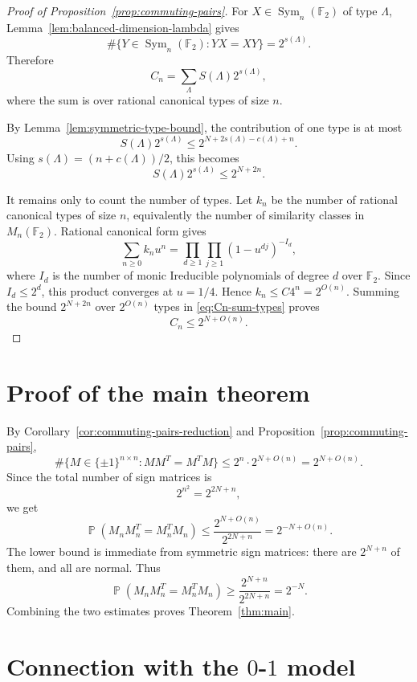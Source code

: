 \documentclass[11pt]{amsart}
\theoremstyle{remark}
\numberwithin{equation}{section}
\newcommand{\F}{\mathbb F}
\newcommand{\Sym}{\operatorname{Sym}}
\DeclareMathOperator{\probb}{\mathbb P}
\begin{document}
\begin{proof}[Proof of Proposition~\ref{prop:commuting-pairs}]
For $X\in\Sym_n(\F_2)$ of type $\Lambda$, Lemma~\ref{lem:balanced-dimension-lambda} gives
\[
        \#\{Y\in\Sym_n(\F_2):YX=XY\}=2^{s(\Lambda)}.
\]
Therefore
\begin{equation}\label{eq:Cn-sum-types}
        C_n=\sum_\Lambda S(\Lambda)2^{s(\Lambda)},
\end{equation}
where the sum is over rational canonical types of size $n$.

By Lemma~\ref{lem:symmetric-type-bound}, the contribution of one type is at most
\[
        S(\Lambda)2^{s(\Lambda)}
        \leq 2^{N+2s(\Lambda)-c(\Lambda)+n}.
\]
Using $s(\Lambda)=(n+c(\Lambda))/2$, this becomes
\[
        S(\Lambda)2^{s(\Lambda)}\leq 2^{N+2n}.
\]

It remains only to count the number of types.  Let $k_n$ be the number of rational canonical types of size $n$, equivalently the number of similarity classes in $M_n(\F_2)$.  Rational canonical form gives
\[
        \sum_{n\geq0}k_nu^n
        =\prod_{d\geq1}\prod_{j\geq1}(1-u^{dj})^{-I_d},
\]
where $I_d$ is the number of monic Ireducible polynomials of degree $d$ over $\F_2$.  Since $I_d\leq2^d$, this product converges at $u=1/4$.  Hence $k_n\leq C4^n=2^{O(n)}$.  Summing the bound $2^{N+2n}$ over $2^{O(n)}$ types in \eqref{eq:Cn-sum-types} proves
\[
        C_n\leq 2^{N+O(n)}.
\]
\end{proof}

\section{Proof of the main theorem}

By Corollary~\ref{cor:commuting-pairs-reduction} and Proposition~\ref{prop:commuting-pairs},
\[
        \#\{M\in\{\pm1\}^{n\times n}:MM^T=M^TM\}
        \leq 2^n\cdot2^{N+O(n)}=2^{N+O(n)}.
\]
Since the total number of sign matrices is
\[
        2^{n^2}=2^{2N+n},
\]
we get
\[
        \probb(M_nM_n^T=M_n^TM_n)
        \leq \frac{2^{N+O(n)}}{2^{2N+n}}
        =2^{-N+O(n)}.
\]
The lower bound is immediate from symmetric sign matrices: there are $2^{N+n}$ of them, and all are normal.  Thus
\[
        \probb(M_nM_n^T=M_n^TM_n)
        \geq \frac{2^{N+n}}{2^{2N+n}}=2^{-N}.
\]
Combining the two estimates proves Theorem~\ref{thm:main}.


\section{Connection with the $0$-$1$ model}\label{sec:zero-one}
\end{document}
